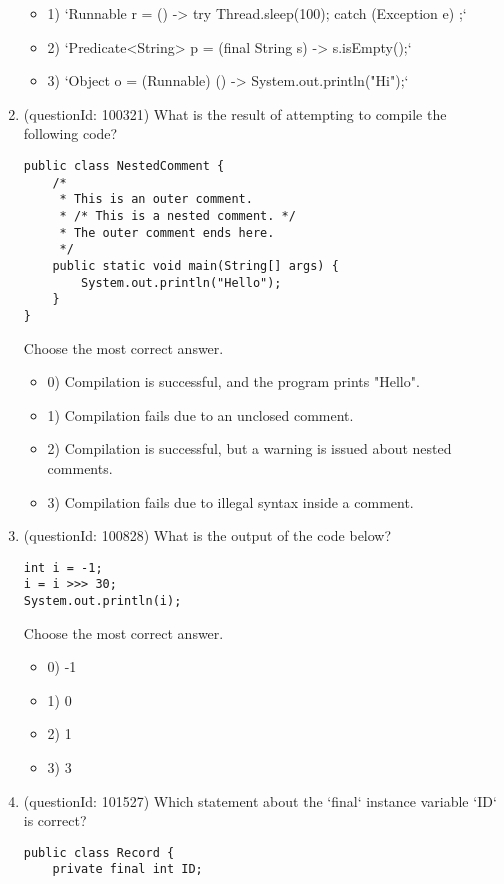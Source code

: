 \documentclass[12pt]{article}
\begin{document}
\begin{enumerate}[label=(\arabic*)]
\begin{itemize}
\item 1) `Runnable r = () -> { try { Thread.sleep(100); } catch (Exception e) {} };`

\item 2) `Predicate<String> p = (final String s) -> s.isEmpty();`

\item 3) `Object o = (Runnable) () -> System.out.println("Hi");`

\end{itemize}
\item (questionId: 100321) What is the result of attempting to compile the following code?
\begin{verbatim}
public class NestedComment {
    /*
     * This is an outer comment.
     * /* This is a nested comment. */
     * The outer comment ends here.
     */
    public static void main(String[] args) {
        System.out.println("Hello");
    }
}
\end{verbatim}
Choose the most correct answer. 
\begin{itemize}
\item 0) Compilation is successful, and the program prints "Hello".

\item 1) Compilation fails due to an unclosed comment.

\item 2) Compilation is successful, but a warning is issued about nested comments.

\item 3) Compilation fails due to illegal syntax inside a comment.

\end{itemize}
\item (questionId: 100828) What is the output of the code below?\n\begin{verbatim}
int i = -1;
i = i >>> 30;
System.out.println(i);
\end{verbatim}
Choose the most correct answer. 
\begin{itemize}
\item 0) -1

\item 1) 0

\item 2) 1

\item 3) 3

\end{itemize}
\item (questionId: 101527) Which statement about the `final` instance variable `ID` is correct?\n\begin{verbatim}
public class Record {
    private final int ID;


\end{verbatim}
\end{enumerate}
\end{document}
